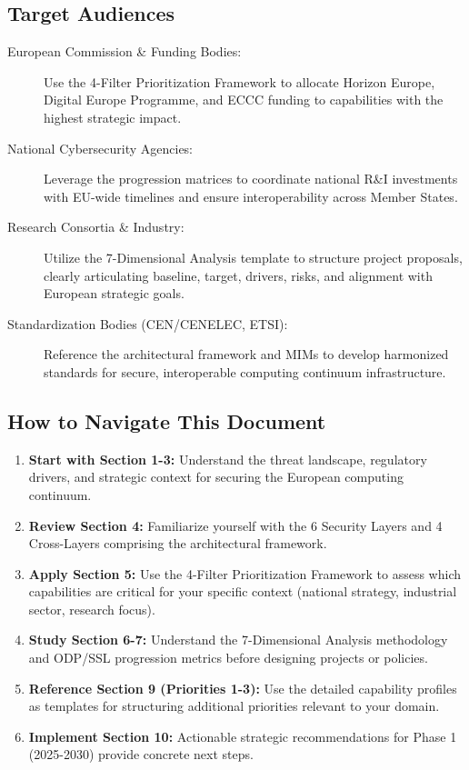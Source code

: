 \documentclass[12pt,a4paper]{article}
\begin{document}
\subsection*{Target Audiences}
\begin{description}
    \item[European Commission \& Funding Bodies:] Use the 4-Filter Prioritization Framework to allocate Horizon Europe, Digital Europe Programme, and ECCC funding to capabilities with the highest strategic impact.
    
    \item[National Cybersecurity Agencies:] Leverage the progression matrices to coordinate national R\&I investments with EU-wide timelines and ensure interoperability across Member States.
    
    \item[Research Consortia \& Industry:] Utilize the 7-Dimensional Analysis template to structure project proposals, clearly articulating baseline, target, drivers, risks, and alignment with European strategic goals.
    
    \item[Standardization Bodies (CEN/CENELEC, ETSI):] Reference the architectural framework and MIMs to develop harmonized standards for secure, interoperable computing continuum infrastructure.
\end{description}

\subsection*{How to Navigate This Document}
\begin{enumerate}
    \item \textbf{Start with Section 1-3:} Understand the threat landscape, regulatory drivers, and strategic context for securing the European computing continuum.
    
    \item \textbf{Review Section 4:} Familiarize yourself with the 6 Security Layers and 4 Cross-Layers comprising the architectural framework.
    
    \item \textbf{Apply Section 5:} Use the 4-Filter Prioritization Framework to assess which capabilities are critical for your specific context (national strategy, industrial sector, research focus).
    
    \item \textbf{Study Section 6-7:} Understand the 7-Dimensional Analysis methodology and ODP/SSL progression metrics before designing projects or policies.
    
    \item \textbf{Reference Section 9 (Priorities 1-3):} Use the detailed capability profiles as templates for structuring additional priorities relevant to your domain.
    
    \item \textbf{Implement Section 10:} Actionable strategic recommendations for Phase 1 (2025-2030) provide concrete next steps.
\end{enumerate}
\end{document}
